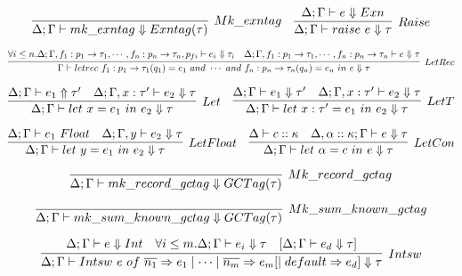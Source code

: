 \documentclass{article}
\begin{document}
$$
\infer[Mk\_exntag]{\Delta; \Gamma \vdash \Mkexntag \Downarrow \Exntag{\tau}}
{
}
\quad
\infer[Raise]{\Delta; \Gamma \vdash \Raise{e} \Downarrow \tau}
{
	\Delta; \Gamma \vdash e \Downarrow \Exn
}
$$


$$
\infer[LetRec]{\Gamma \vdash \LetRec{f_1: \PArrow{p_1}{\tau_1} (q_1) = e_1 \And \cdots \And f_n: \PArrow{p_n}{\tau_n} (q_n) = e_n}{e} \Downarrow \tau}
{
	\forall i \leq n . \Delta; \Gamma, f_1: \PArrow{p_1}{\tau_1}, \cdots, f_n: \PArrow{p_n}{\tau_n}, p_{fi} \vdash e_i \Downarrow \tau_i
	\quad \Delta; \Gamma, f_1: \PArrow{p_1}{\tau_1}, \cdots, f_n: \PArrow{p_n}{\tau_n} \vdash e \Downarrow \tau
}
$$

$$
\infer[Let]{\Delta; \Gamma \vdash \Let{x}{e_1}{e_2} \Downarrow \tau}
{
	\Delta; \Gamma \vdash e_1 \Uparrow \tau'
	\quad \Delta; \Gamma, x: \tau' \vdash e_2 \Downarrow \tau
}
\quad
\infer[LetT]{\Delta; \Gamma \vdash \LetT{x}{\tau'}{e_1}{e_2} \Downarrow \tau}
{
	\Delta; \Gamma \vdash e_1 \Downarrow \tau'
	\quad \Delta; \Gamma, x: \tau' \vdash e_2 \Downarrow \tau
}
$$

$$
\infer[LetFloat]{\Delta; \Gamma \vdash \Let{y}{e_1}{e_2} \Downarrow \tau}
{
	\Delta; \Gamma \vdash e_1\ \Float
	\quad \Delta; \Gamma, y \vdash e_2 \Downarrow \tau
}
\quad
\infer[LetCon]{\Delta; \Gamma \vdash \Let{\alpha}{c}{e} \Downarrow \tau}
{
	\Delta \vdash c :: \kappa
	\quad \Delta, \alpha:: \kappa; \Gamma\vdash e \Downarrow \tau
}
$$


$$
\infer[Mk\_record\_gctag]{\Delta; \Gamma \vdash \Mkrecordgctag \Downarrow \GCTag{\tau}}{}
$$

$$
\infer[Mk\_sum\_known\_gctag]{\Delta; \Gamma \vdash \Mksumknowngctag \Downarrow \GCTag{\tau}}{}
$$

$$
\infer[Intsw]{\Delta; \Gamma \vdash \Intsw{e}{\overline{n_1} \Rightarrow e_1 \mid \cdots \mid \overline{n_m} \Rightarrow e_m [\mid default \Rightarrow e_d] \Downarrow \tau}}
{
	\Delta; \Gamma \vdash e \Downarrow \TInt
	\quad \forall i \leq m . \Delta; \Gamma \vdash e_i \Downarrow \tau
	\quad [\Delta; \Gamma \vdash e_d \Downarrow \tau]
}
$$
\end{document}
